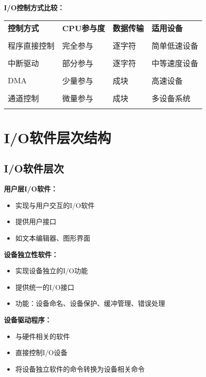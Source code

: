 \documentclass[lang=cn,newtx,10pt,scheme=chinese]{../../elegantbook}
\begin{document}
\textbf{I/O控制方式比较：}
\begin{longtable}{@{}p{3cm}p{3cm}p{3cm}p{4cm}@{}}
\toprule
\textbf{控制方式} & \textbf{CPU参与度} & \textbf{数据传输} & \textbf{适用设备} \\\\ \midrule
\endhead

程序直接控制 & 完全参与 & 逐字符 & 简单低速设备 \\\\
中断驱动 & 部分参与 & 逐字符 & 中等速度设备 \\\\
DMA & 少量参与 & 成块 & 高速设备 \\\\
通道控制 & 微量参与 & 成块 & 多设备系统 \\\\

\bottomrule
\end{longtable}

\section{I/O软件层次结构}

\subsection{I/O软件层次}

\textbf{用户层I/O软件：}
\begin{itemize}
  \item 实现与用户交互的I/O软件
  \item 提供用户接口
  \item 如文本编辑器、图形界面
\end{itemize}

\textbf{设备独立性软件：}
\begin{itemize}
  \item 实现设备独立的I/O功能
  \item 提供统一的I/O接口
  \item 功能：设备命名、设备保护、缓冲管理、错误处理
\end{itemize}

\textbf{设备驱动程序：}
\begin{itemize}
  \item 与硬件相关的软件
  \item 直接控制I/O设备
  \item 将设备独立软件的命令转换为设备相关命令
\end{itemize}
\end{document}
